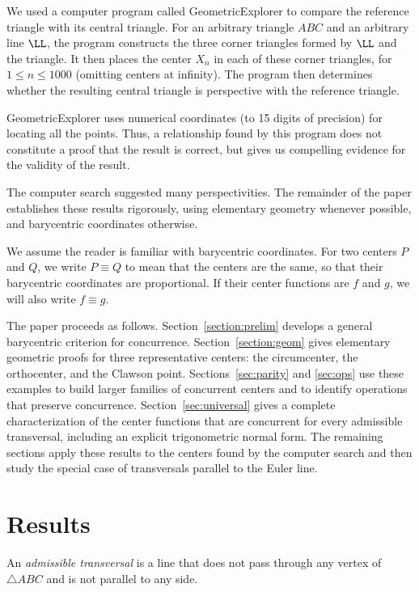 \documentclass[12pt,a4paper]{amsart}
\theoremstyle{remark}
\begin{document}
We used a computer program called GeometricExplorer to compare the reference
triangle with its central triangle.
For an arbitrary triangle $ABC$ and an arbitrary line $\LL$,
the program constructs the three corner triangles formed by $\LL$ and the triangle.
It then places the center $X_n$ in each of these corner triangles, for $1\leq n\leq1000$
(omitting centers at infinity).
The program then determines whether the resulting central triangle is perspective with the reference triangle.

GeometricExplorer uses numerical coordinates (to 15 digits of precision) for locating
all the points. Thus, a relationship found by this program does not constitute a proof that the result is correct,
but gives us compelling evidence for the validity of the result.

The computer search suggested many perspectivities.  The remainder of the paper
establishes these results rigorously, using elementary geometry whenever possible,
and barycentric coordinates otherwise.

We assume the reader is familiar with barycentric coordinates.  For two centers
$P$ and $Q$, we write $P\equiv Q$ to mean that the centers are the same, so that
their barycentric coordinates are proportional.  If their center functions \cite{center} are
$f$ and $g$, we will also write $f\equiv g$.

The paper proceeds as follows.  Section~\ref{section:prelim} develops a general barycentric
criterion for concurrence.  Section~\ref{section:geom} gives elementary geometric proofs for three
representative centers: the circumcenter, the orthocenter, and the Clawson point.
Sections~\ref{sec:parity} and \ref{sec:ops} use these examples to build larger families of concurrent
centers and to identify operations that preserve concurrence.  Section~\ref{sec:universal} gives a
complete characterization of the center functions that are concurrent for every
admissible transversal, including an explicit trigonometric normal form.  The
remaining sections apply these results to the centers found by the computer
search and then study the special case of transversals parallel to the Euler line.

\section{Results}

An \emph{admissible transversal} is a line that does not pass through any vertex of $\triangle ABC$
and is not parallel to any side.
\end{document}
